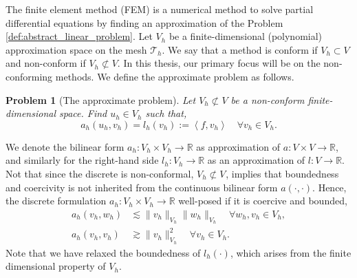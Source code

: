 \documentclass[11pt]{article}
\newtheorem{problem}[theorem]{Problem}
\theoremstyle{remark}
\numberwithin{equation}{section}
\begin{document}
The finite element method (FEM) is a numerical method to solve partial differential equations by finding an approximation of the Problem \ref{def:abstract_linear_problem}.  Let $V_{h}$ be a finite-dimensional (polynomial) approximation space on the mesh
$\mathcal{T} _{h}$. We say that a method is conform if $V_{h}\subset V $ and non-conform if $V _{h} \not\subset V$. In this thesis, our primary focus will be on the non-conforming methods. We define the approximate problem as follows.
\begin{problem}[The approximate problem]
    \label{def:approx_problem}
    Let $V_{h} \not\subset V$ be a non-conform finite-dimensional space. Find  $u_{h} \in V_{h}$ such that,
    \begin{equation}
        a_{h}(u_{h},v_{h} ) = l_{h}( v_{h}) :=  \left<f,v_{h} \right> \quad   \forall v_{h} \in V_{h}.
    \end{equation}
\end{problem}

We denote the bilinear form $a_{h}: V_{h} \times V_{h} \to \mathbb{R} $ as approximation of $a: V \times V \to \mathbb{R} $, and similarly for the right-hand side $l_{h} : V _{h} \to \mathbb{R} $ as an approximation of $l: V \to \mathbb{R} $.
Not that since the discrete is non-conformal, $V_{h} \not \subset  V_{}$, implies that boundedness and coercivity is not inherited from the continuous bilinear form $a( \cdot ,\cdot ) $. Hence, the discrete formulation $a_{h}:V_{h} \times V_{h}
\to \mathbb{R}  $ well-posed if it is coercive and bounded, \begin{equation}
    \label{eq:discrete_wellposed}
    \begin{split}
   a_{h}( v_{h}, w_{h}) & \lesssim \| v_{h} \|_{ V_{h} }^{  } \| w_{h} \|_{ V_{h} }^{  } \quad    \forall w_{h},v_{h} \in V_{h},\\
   a_{h}( v_{h}, v_{h}) & \gtrsim  \| v_{h} \|_{ V_{h} }^{  2} \quad  \forall v_{h} \in V_{h}.
    \end{split}
\end{equation}
Note that we have relaxed the boundedness of $l_{h}( \cdot ) $, which arises from the finite dimensional property of $V_{h}$.
\end{document}
